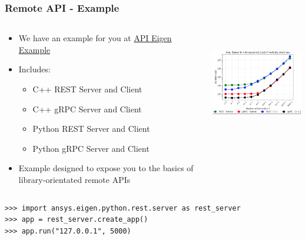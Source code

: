 \documentclass[t]{beamer}
\begin{document}
\begin{frame}[fragile=singleslide]
  \frametitle{Remote API - Example}
  \vspace{-10pt}

  \begin{columns}[T]
    \begin{column}{.6\textwidth}
      \vspace{-5pt}
      \begin{itemize}
      \item{We have an example for you at
        \href{https://apieigen.docs.ansys.com/index.html}{API Eigen Example}}
      \item{Includes:}
        \begin{itemize}
        \item{C++ REST Server and Client}
        \item{C++ gRPC Server and Client}
        \item{Python REST Server and Client}
        \item{Python gRPC Server and Client}
        \end{itemize}
      \item{Example designed to expose you to the basics of library-orientated
        remote APIs}
      \end{itemize}
    \end{column}

    \begin{column}{.45\textwidth}
      \centering
      \includegraphics[height=4.5cm]{figures/api-benchmark.png}
    \end{column}

  \end{columns}

      \begin{example}
      \vspace{-5pt}
        \begin{lstlisting}[basicstyle=\tiny]
>>> import ansys.eigen.python.rest.server as rest_server
>>> app = rest_server.create_app()
>>> app.run("127.0.0.1", 5000)
        \end{lstlisting}
        \vspace{-5pt}
      \end{example}

\end{frame}

\lastframe{}
\end{document}
